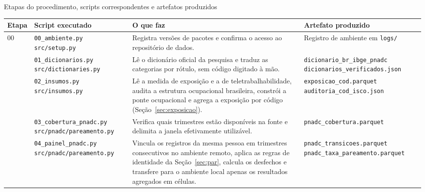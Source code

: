 \begin{quadro}[htbp]
  \caption{Etapas do procedimento, scripts correspondentes e artefatos produzidos}
  \label{qua:etapas}
  \centering
  \espacosimples\idpcorpodez
  \begin{tabular}{@{}p{0.9cm}p{3.9cm}p{4.5cm}p{5.0cm}@{}}
    \toprule
    \textbf{Etapa} & \textbf{Script executado} & \textbf{O que faz} & \textbf{Artefato produzido} \\
    \midrule
    00 & \texttt{00\_ambiente.py} \newline \texttt{src/setup.py}
       & Registra versões de pacotes e confirma o acesso ao repositório de dados.
       & Registro de ambiente em \texttt{logs/} \\
    \addlinespace[2pt]
    01 & \texttt{01\_dicionarios.py} \newline \texttt{src/dictionaries.py}
       & Lê o dicionário oficial da pesquisa e traduz as categorias por rótulo,
         sem código digitado à mão.
       & \texttt{dicionario\_br\_ibge\_pnadc} \newline \texttt{dicionarios\_verificados.json} \\
    \addlinespace[2pt]
    02 & \texttt{02\_insumos.py} \newline \texttt{src/insumos.py}
       & Lê a medida de exposição e a de teletrabalhabilidade, audita a estrutura
         ocupacional brasileira, constrói a ponte ocupacional e agrega a
         exposição por código (Seção~\ref{sec:exposicao}).
       & \texttt{exposicao\_cod.parquet} \newline \texttt{auditoria\_cod\_isco.json} \\
    \addlinespace[2pt]
    03 & \texttt{03\_cobertura\_pnadc.py} \newline \texttt{src/pnadc/pareamento.py}
       & Verifica quais trimestres estão disponíveis na fonte e delimita a janela
         efetivamente utilizável.
       & \texttt{pnadc\_cobertura.parquet} \\
    \addlinespace[2pt]
    04 & \texttt{04\_painel\_pnadc.py} \newline \texttt{src/pnadc/pareamento.py}
       & Vincula os registros da mesma pessoa em trimestres consecutivos no
         ambiente remoto, aplica as regras de identidade da
         Seção~\ref{sec:par}, calcula os desfechos e transfere para o ambiente
         local apenas os resultados agregados em células.
       & \texttt{pnadc\_transicoes.parquet} \newline \texttt{pnadc\_taxa\_pareamento.parquet} \\

\end{tabular}
\end{quadro}
